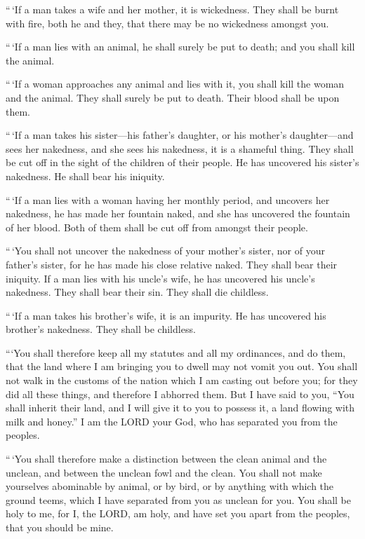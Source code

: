  ``\,`If a man takes a wife and her mother, it is
wickedness. They shall be burnt with fire, both he and they, that there
may be no wickedness amongst you.

 ``\,`If a man lies with an animal, he shall surely be put
to death; and you shall kill the animal.

 ``\,`If a woman approaches any animal and lies with it,
you shall kill the woman and the animal. They shall surely be put to
death. Their blood shall be upon them.

 ``\,`If a man takes his sister---his father's daughter, or
his mother's daughter---and sees her nakedness, and she sees his
nakedness, it is a shameful thing. They shall be cut off in the sight of
the children of their people. He has uncovered his sister's nakedness.
He shall bear his iniquity.

 ``\,`If a man lies with a woman having her monthly period,
and uncovers her nakedness, he has made her fountain naked, and she has
uncovered the fountain of her blood. Both of them shall be cut off from
amongst their people.

 ``\,`You shall not uncover the nakedness of your mother's
sister, nor of your father's sister, for he has made his close relative
naked. They shall bear their iniquity.  If a man lies with
his uncle's wife, he has uncovered his uncle's nakedness. They shall
bear their sin. They shall die childless.

 ``\,`If a man takes his brother's wife, it is an impurity.
He has uncovered his brother's nakedness. They shall be childless.

 ```You shall therefore keep all my statutes and all my
ordinances, and do them, that the land where I am bringing you to dwell
may not vomit you out.  You shall not walk in the customs
of the nation which I am casting out before you; for they did all these
things, and therefore I abhorred them.  But I have said to
you, ``You shall inherit their land, and I will give it to you to
possess it, a land flowing with milk and honey.'' I am the LORD your
God, who has separated you from the peoples.

 ``\,`You shall therefore make a distinction between the
clean animal and the unclean, and between the unclean fowl and the
clean. You shall not make yourselves abominable by animal, or by bird,
or by anything with which the ground teems, which I have separated from
you as unclean for you.  You shall be holy to me, for I,
the LORD, am holy, and have set you apart from the peoples, that you
should be mine.

